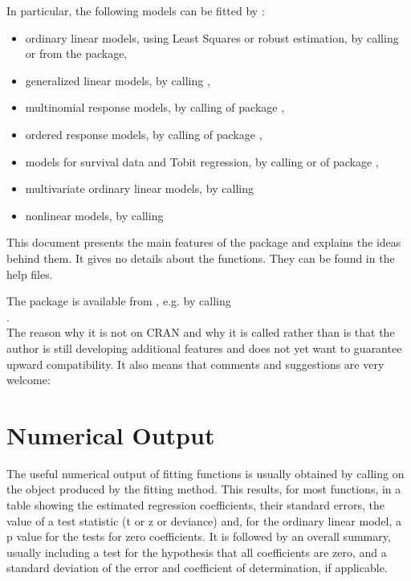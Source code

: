 \documentclass[11pt]{article}
\begin{document}
In particular, the following models can be fitted by :
\begin{itemize}
\item 
  ordinary linear models, using Least Squares or robust estimation,
  by calling  or  from the  package,
\item
  generalized linear models, by calling ,
\item
  multinomial response models, by calling  of package
  ,
\item
  ordered response models, by calling  of package
  ,
\item
  models for survival data and Tobit regression, by calling
   or  of package ,
\item
  multivariate ordinary linear models, by calling 
\item
  nonlinear models, by calling 
\end{itemize}

This document presents the main features of the package 
and explains the ideas behind them. 
It gives no details about the functions. They can be found in
the help files.

The package is available from , e.g. by calling\\
.\\
The reason why it is not on CRAN and why it is called  rather than 
 is that the author is still developing additional features and
does not yet want to guarantee upward compatibility.
It also means that comments and suggestions are very welcome:

\section{Numerical Output}
The useful numerical output of fitting functions is usually obtained by
calling  on the object produced by the fitting method.
This results, for most functions, in a table showing the estimated
regression coefficients, their standard errors, the value of a test
statistic (t or z or deviance) and, for the 
ordinary linear model, a p value for the tests for zero coefficients. 
It is followed by an overall summary, usually including a test for
the hypothesis that all coefficients are zero, and a standard deviation of
the error and coefficient of determination, if applicable.
\end{document}
